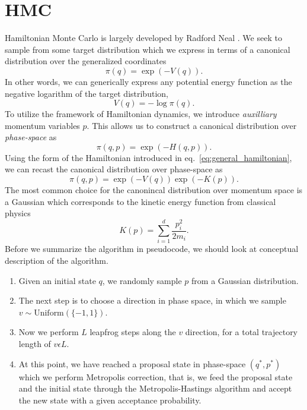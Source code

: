 \section{HMC}
Hamiltonian Monte Carlo is largely developed by Radford Neal \cite{hmc}. We seek to sample from some target distribution which we express
in terms of a canonical distribution over the generalized coordinates
\begin{equation}\label{eq:canonical_q}
  \pi(q) = \exp\left(-V(q)\right).
\end{equation}
In other words, we can generically express any potential energy function as the negative logarithm of the target distribution,
\begin{equation}\label{eq:general_potential}
  V(q) = -\log \pi(q).
\end{equation}
To utilize the framework of Hamiltonian dynamics, we introduce \textit{auxilliary}
momentum variables $p$. This allows us to construct a canonical distribution
over \textit{phase-space} as
\begin{equation}
  \pi(q, p) = \exp\left(-H(q, p)\right).
\end{equation}
Using the form of the Hamiltonian introduced in eq.~\eqref{eq:general_hamiltonian}, we can recast the canonical distribution over phase-space as
\begin{equation}
  \pi(q, p) = \exp\left(-V(q)\right)\exp\left(-K(p)\right).
\end{equation}
The most common choice for the canonincal distribution over momentum space is a Gaussian which corresponds to the kinetic energy function
from classical physics
\begin{equation}\label{eq:kinetic_energy}
  K(p) = \sum_{i=1}^d \frac{p_i^2}{2m_i}.
\end{equation}
Before we summarize the algorithm in pseudocode, we should look at conceptual description of the algorithm.
\begin{enumerate}
  \item Given an initial state $q$, we randomly sample $p$ from a Gaussian distribution.
  \item The next step is to choose a direction in phase space, in which we sample $v \sim \text{Uniform}(\{-1, 1\})$.
  \item Now we perform $L$ leapfrog steps along the $v$ direction, for a total trajectory length of $v\epsilon L$.
  \item At this point, we have reached a proposal state in phase-space $(q^*, p^*)$ which we perform Metropolis correction,
  that is, we feed the proposal state and the initial state through the Metropolis-Hastings algorithm and accept the new
  state with a given acceptance probability.
\end{enumerate}
